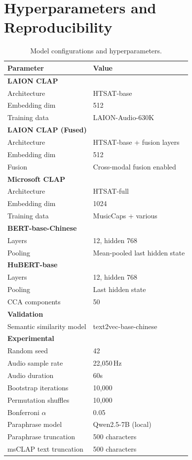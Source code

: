 \documentclass[11pt]{article}
\begin{document}
\section{Hyperparameters and Reproducibility}\label{app:hyperparams}

\begin{table}[!h]
\centering
\caption{Model configurations and hyperparameters.}
\label{tab:hyperparams}
\small
\begin{tabular}{l l}
\toprule
\textbf{Parameter} & \textbf{Value} \\
\midrule
\multicolumn{2}{l}{\textbf{LAION CLAP}} \\
Architecture & HTSAT-base \\
Embedding dim & 512 \\
Training data & LAION-Audio-630K \\
\multicolumn{2}{l}{\textbf{LAION CLAP (Fused)}} \\
Architecture & HTSAT-base + fusion layers \\
Embedding dim & 512 \\
Fusion & Cross-modal fusion enabled \\
\multicolumn{2}{l}{\textbf{Microsoft CLAP}} \\
Architecture & HTSAT-full \\
Embedding dim & 1024 \\
Training data & MusicCaps + various \\
\multicolumn{2}{l}{\textbf{BERT-base-Chinese}} \\
Layers & 12, hidden 768 \\
Pooling & Mean-pooled last hidden state \\
\multicolumn{2}{l}{\textbf{HuBERT-base}} \\
Layers & 12, hidden 768 \\
Pooling & Last hidden state \\
CCA components & 50 \\
\multicolumn{2}{l}{\textbf{Validation}} \\
Semantic similarity model & text2vec-base-chinese \\
\multicolumn{2}{l}{\textbf{Experimental}} \\
Random seed & 42 \\
Audio sample rate & 22,050\,Hz \\
Audio duration & 60s \\
Bootstrap iterations & 10,000 \\
Permutation shuffles & 10,000 \\
Bonferroni $\alpha$ & 0.05 \\
Paraphrase model & Qwen2.5-7B (local) \\
Paraphrase truncation & 500 characters \\
msCLAP text truncation & 500 characters \\
\bottomrule
\end{tabular}
\end{table}
\end{document}
